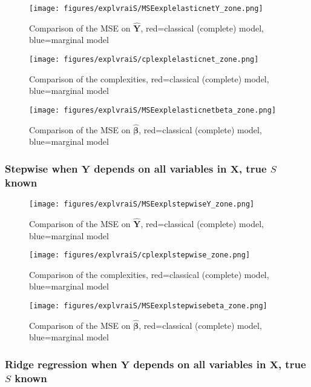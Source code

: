 \documentclass[12pt,a4paper]{report}
\begin{document}
	\begin{figure}[h!]
	\centering
		  \texttt{[image: figures/explvraiS/MSEexplelasticnetY\_zone.png]}
		\caption{Comparison of the MSE on $\hat{\boldsymbol{Y}}$, red=classical (complete) model, blue=marginal model}\label{MSEexplelasticnetY_zone}
	\end{figure}
	\begin{figure}[h!]
	\centering
		  \texttt{[image: figures/explvraiS/cplexplelasticnet\_zone.png]}
		\caption{Comparison of the complexities, red=classical (complete) model, blue=marginal model}\label{cplexplelasticnet_zone}
	\end{figure}
	\begin{figure}[h!]
	\centering
		  \texttt{[image: figures/explvraiS/MSEexplelasticnetbeta\_zone.png]}
		\caption{Comparison of the MSE on $\hat{\boldsymbol{\beta}}$, red=classical (complete) model, blue=marginal model}\label{MSEexplelasticnetbeta_zone}
	\end{figure}
	\FloatBarrier
\newpage
\subsubsection{Stepwise when $\boldsymbol{Y}$ depends on all variables in $\boldsymbol{X}$, true $S$ known}

	\begin{figure}[h!]
	\centering
		  \texttt{[image: figures/explvraiS/MSEexplstepwiseY\_zone.png]}
		\caption{Comparison of the MSE on $\hat{\boldsymbol{Y}}$, red=classical (complete) model, blue=marginal model}\label{MSEexplstepwiseY_zone}
	\end{figure}
	\begin{figure}[h!]
	\centering
		  \texttt{[image: figures/explvraiS/cplexplstepwise\_zone.png]}
		\caption{Comparison of the complexities, red=classical (complete) model, blue=marginal model}\label{cplexplstepwise_zone}
	\end{figure}
	\begin{figure}[h!]
	\centering
		  \texttt{[image: figures/explvraiS/MSEexplstepwisebeta\_zone.png]}
		\caption{Comparison of the MSE on $\hat{\boldsymbol{\beta}}$, red=classical (complete) model, blue=marginal model}\label{MSEexplstepwisebeta_zone}
	\end{figure}
	\FloatBarrier
\newpage
\subsubsection{Ridge regression when $\boldsymbol{Y}$ depends on all variables in $\boldsymbol{X}$, true $S$ known}
\end{document}
